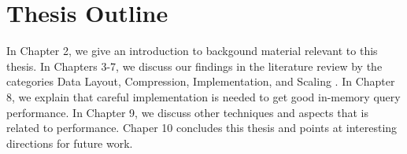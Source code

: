 \section{Thesis Outline}
\label{sec:Thesis Outline}
In Chapter 2, we give an introduction to backgound material relevant to this thesis. In Chapters 3-7, we discuss our findings in the literature review by the categories Data Layout, Compression, Implementation, and Scaling . In Chapter 8, we explain that careful implementation is needed to get good in-memory query performance. In Chapter 9, we discuss other techniques and aspects that is related to performance. Chaper 10 concludes this thesis and points at interesting directions for future work.
